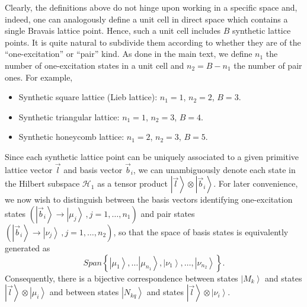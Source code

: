 \documentclass[prl,aps,twocolumn,showpacs,superscriptaddress,longbibliography]{revtex4-1}
\newcommand{\be}{\begin{equation}}
\newcommand{\ee}{\end{equation}}
\newcommand{\mal}{\mathcal}
\newcommand{\ran}{\right\rangle}
\newcommand{\set}[1]{\left\{  #1  \right\}}
\newcommand{\ket}[1]{\left| #1 \ran}
\begin{document}
Clearly, the definitions above do not hinge upon working in a specific space and, indeed, one can analogously define a unit cell in direct space which contains a single Bravais lattice point. Hence, such a unit cell includes $B$ synthetic lattice points. It is quite natural to subdivide them according to whether they are of the ``one-excitation'' or ``pair'' kind. As done in the main text, we define $n_1$ the number of one-excitation states in a unit cell and $n_2 = B - n_1$ the number of pair ones. For example,
\begin{itemize}
	\item Synthetic square lattice (Lieb lattice): $n_1 = 1$, $n_2 = 2$, $B = 3$.
	\item Synthetic triangular lattice: $n_1 = 1$, $n_2 = 3$, $B = 4$.
	\item Synthetic honeycomb lattice: $n_1 = 2$, $n_2 = 3$, $B = 5$.
\end{itemize}
Since each synthetic lattice point can be uniquely associated to a given primitive lattice vector $\vec{l}$ and basis vector $\vec{b}_i$, we can unambiguously denote each state in the Hilbert subspace $\mal{H}_1$ as a tensor product $\ket{\vec{l}} \otimes \ket{\vec{b}_i}$. For later convenience, we now wish to distinguish between the basis vectors identifying one-excitation states $\left(\ket{\vec{b}_i} \to \ket{\mu_j}\,,j=1 ,\ldots, n_1\right)$ and pair states
$ \left(\ket{\vec{b}_i} \to \ket{\nu_j}\,,j=1 ,\ldots, n_2\right)$, so that the space of basis states is equivalently generated as
\be
	Span \set{  \ket{\mu_1}, \ldots \ket{\mu_{n_1}}, \ket{\nu_1} , \ldots, \ket{\nu_{n_2}} }.
\ee
Consequently, there is a bijective correspondence between states $\ket{M_k}$ and states $\ket{\vec{l}} \otimes \ket{\mu_i}$ and between states $\ket{N_{kq}}$ and states $\ket{\vec{l}} \otimes \ket{\nu_i}$.
\end{document}
